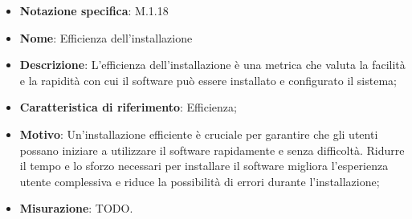 \begin{itemize}
    \item \textbf{Notazione specifica}: M.1.18
    \item \textbf{Nome}: Efficienza dell'installazione
    \item \textbf{Descrizione}: L'efficienza dell'installazione è una metrica che valuta la facilità e la rapidità con cui il software può essere installato e configurato il sistema;
    \item \textbf{Caratteristica di riferimento}: Efficienza;
    \item \textbf{Motivo}: Un'installazione efficiente è cruciale per garantire che gli utenti possano iniziare a utilizzare il software rapidamente e senza difficoltà. Ridurre il tempo e lo sforzo necessari per installare il software migliora l'esperienza utente complessiva e riduce la possibilità di errori durante l'installazione;
    \item \textbf{Misurazione}: TODO.
\end{itemize}
